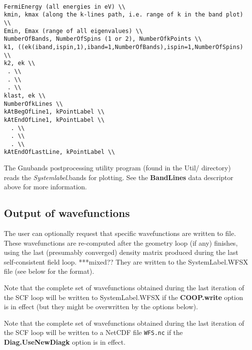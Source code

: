 \documentclass[11pt]{article}
\begin{document}
\begin{verbatim}

FermiEnergy (all energies in eV) \\
kmin, kmax (along the k-lines path, i.e. range of k in the band plot) \\
Emin, Emax (range of all eigenvalues) \\
NumberOfBands, NumberOfSpins (1 or 2), NumberOfkPoints \\
k1, ((ek(iband,ispin,1),iband=1,NumberOfBands),ispin=1,NumberOfSpins) \\
k2, ek \\
 . \\
 . \\
 . \\
klast, ek \\
NumberOfkLines \\
kAtBegOfLine1, kPointLabel \\
kAtEndOfLine1, kPointLabel \\
  . \\
  . \\
  . \\
kAtEndOfLastLine, kPointLabel \\
\end{verbatim}

\noindent
The {\sc Gnubands} postprocessing
utility program (found in the Util/ directory) reads the {\it
  Systemlabel}.bands for plotting.  See the {\bf BandLines} data
descriptor above for more information.

\subsection{Output of wavefunctions}
\label{sec:wf-output-user}

The user can optionally request that specific wavefunctions are
written to file. These wavefunctions are re-computed after the
geometry loop (if any) finishes, using the last (presumably converged)
density matrix produced during the last self-consistent field loop. ***mixed??
They are written to the SystemLabel.WFSX file (see below for the
format).

Note that the complete set of wavefunctions obtained during the last
iteration of the SCF loop will be written to SystemLabel.WFSX 
if the {\bf COOP.write} option is in effect (but they might be
overwritten by the options below).

Note that the complete set of wavefunctions obtained during the last
iteration of the SCF loop will be written to a NetCDF file
{\tt WFS.nc} if the {\bf Diag.UseNewDiagk} option is in effect.
\end{document}
